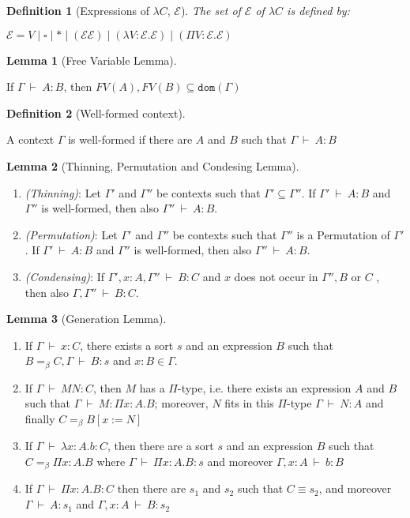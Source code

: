 \documentclass[12pt, a4paper]{article}
\newcommand{\deriv}{\ \vdash\ }
\newtheorem{definition}{Definition}[section]
\newtheorem{lemma}{Lemma}[section]
\begin{document}
\begin{definition}[Expressions of $\lambda C$, $\mathcal{E}$]
    The set of $\mathcal{E}$ of $\lambda C$ is defined by:
\end{definition}
$\mathcal{E} = V \mid \square \mid * \mid (\mathcal{E}\mathcal{E}) \mid (\lambda V: \mathcal{E}. \mathcal{E}) \mid (\Pi V : \mathcal{E}. \mathcal{E})$

\begin{lemma}[Free Variable Lemma]
\end{lemma}
If $\Gamma \deriv A : B$, then $FV(A), FV(B) \subseteq \mathtt{dom}(\Gamma)$

\begin{definition}[Well-formed context]
\end{definition}
A context $\Gamma$ is well-formed if there are $A$ and $B$ such that $\Gamma \deriv A : B$

\begin{lemma}[Thinning, Permutation and Condesing Lemma]
\end{lemma}
\begin{enumerate}
    \item \textit{(Thinning)}: Let $\Gamma'$ and $\Gamma''$ be contexts such that $\Gamma' \subseteq \Gamma''$. If $\Gamma' \deriv A : B$ and $\Gamma''$ is well-formed, then also $\Gamma'' \deriv A : B$.
    \item \textit{(Permutation)}: Let $\Gamma'$ and $\Gamma''$ be contexts such that $\Gamma''$ is a Permutation of  $\Gamma'$. If $\Gamma' \deriv A : B$ and $\Gamma''$ is well-formed, then also $\Gamma'' \deriv A : B$.
    \item \textit{(Condensing)}: If $\Gamma', x : A, \Gamma'' \deriv B : C$ and $x$ does not occur in $\Gamma'', B \text{ or } C$ , then also $\Gamma, \Gamma'' \deriv B : C$.
\end{enumerate}

\begin{lemma}[Generation Lemma]
\end{lemma}
\begin{enumerate}
    \item If $\Gamma \deriv x : C$, there exists a sort $s$ and an expression $B$ such that $B =_\beta C, \Gamma \deriv B : s$ and $x : B \in \Gamma$.
    \item If $\Gamma \deriv MN: C$, then $M$ has a $\Pi$-type, i.e. there exists an expression $A$ and $B$ such that $\Gamma \deriv M : \Pi x : A. B$; moreover, $N$ fits in this $\Pi$-type $\Gamma \deriv N :A$ and finally $C =_\beta B[x := N]$
    \item If $\Gamma \deriv \lambda x : A. b : C$, then there are a sort $s$ and an expression $B$ such that $C =_\beta \Pi x : A. B$ where $\Gamma \deriv \Pi x: A. B :s$ and moreover $\Gamma, x: A \deriv b:B$
    \item If $\Gamma \deriv \Pi x:A. B:C$ then there are $s_1$ and $s_2$ such that $C \equiv s_2$, and moreover $\Gamma \deriv A : s_1$ and $\Gamma, x : A \deriv B : s_2$
\end{enumerate}
\end{document}
